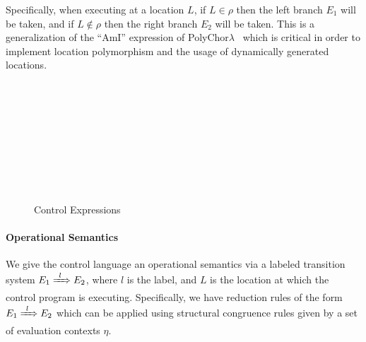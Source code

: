 Specifically, when executing at a location $L$, if $L \in \rho$ then the left branch $E_1$ will be taken, and if $L \notin \rho$ then the right branch $E_2$ will be taken.
This is a generalization of the ``AmI'' expression of PolyChor$\lambda$~\citep{GraversenHM23} which is critical in order to implement location polymorphism and the usage of dynamically generated locations.

\begin{figure}
  \begin{syntax}
     \alternative{\CtrlFail}   \\
      \\
      \\
     \alternative{\RecvFrom{\ell}} \\
     \\
     \\
     \\
    \\

    \alternative{\CtrlFail}  


    \abstractCategory[Systems]{\Pi}
  \end{syntax}

  \caption{Control Expressions}
  \label{fig:control-lang-syntax}
\end{figure}

\paragraph{Operational Semantics}
\label{sec:control-lang-semantics}
We give the control language an operational semantics via a labeled transition system $E_1 \ctrlstep[l] E_2$, where $l$ is the label, and $L$ is the location at which the control program is executing.
Specifically, we have reduction rules of the form $E_1 \ctrlstep[l] E_2$ which can be applied using structural congruence rules given by a set of evaluation contexts $\eta$.

